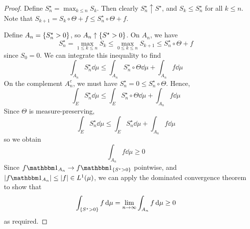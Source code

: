 \begin{proof}
    Define \( S_n^\star = \max_{k \leq n} S_k \).
    Then clearly \( S_n^\star \uparrow S^\star \), and \( S_k \leq S_n^\star \) for all \( k \leq n \).
    Note that \( S_{k+1} = S_k \circ \Theta + f \leq S_n^\star \circ \Theta + f \).

    Define \( A_n = \qty{S_n^\star > 0} \), so \( A_n \uparrow \qty{S^\star > 0} \).
    On \( A_n \), we have
    \[ S_n^\star = \max_{1 \leq k \leq n} S_k \leq \max_{0 \leq k \leq n} S_{k+1} \leq S_n^\star \circ \Theta + f \]
    since \( S_0 = 0 \).
    We can integrate this inequality to find
    \[ \int_{A_n} S_n^\star \dd{\mu} \leq \int_{A_n} S_n^\star \circ \Theta \dd{\mu} + \int_{A_n} f \dd{\mu} \]
    On the complement \( A_n^c \), we must have \( S_n^\star = 0 \leq S_n^\star \circ \Theta \).
    Hence,
    \[ \int_E S_n^\star \dd{\mu} \leq \int_E S_n^\star \circ \Theta \dd{\mu} + \int_{A_n} f \dd{\mu} \]
    Since \( \Theta \) is measure-preserving,
    \[ \int_E S_n^\star \dd{\mu} \leq \int_E S_n^\star \dd{\mu} + \int_{A_n} f \dd{\mu} \]
    so we obtain
    \[ \int_{A_n} f \dd{\mu} \geq 0 \]
    Since \( f \mathbbm 1_{A_n} \to f \mathbbm 1_{\qty{S^\star > 0}} \) pointwise, and \( \abs{f \mathbbm 1_{A_n}} \leq \abs{f} \in L^1(\mu) \), we can apply the dominated convergence theorem to show that
    \[ \int_{\qty{S^\star > 0}} f \dd{\mu} = \lim_{n \to \infty} \int_{A_n} f \dd{\mu} \geq 0 \]
    as required.
\end{proof}

